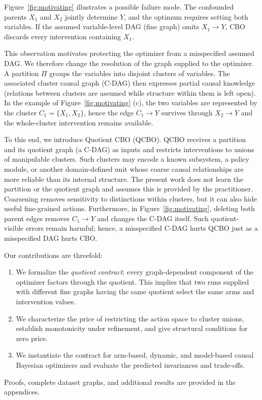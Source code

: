 \documentclass[twoside]{article}
\begin{document}
Figure~\ref{fig:motivating} illustrates a possible failure mode. The confounded parents $X_1$ and $X_2$ jointly determine $Y$, and the optimum requires setting both variables. If the assumed variable-level DAG (fine graph) omits $X_1\to Y$, CBO discards every intervention containing $X_1$. 

This observation motivates protecting the optimizer from a misspecified assumed DAG. We therefore change the resolution of the graph supplied to the optimizer. A partition $\Pi$ groups the variables into disjoint clusters of variables. The associated cluster causal graph (C-DAG) then expresses partial causal knowledge (relations between clusters are assumed while structure within them is left open). In the example of Figure~\ref{fig:motivating} (c), the two variables are represented by the cluster $C_1=\{X_1,X_2\}$, hence the edge $C_1\to Y$ survives through $X_2\to Y$ and the whole-cluster intervention remains available.

To this end, we introduce Quotient CBO (QCBO). QCBO receives a partition and its quotient graph (a C-DAG) as inputs and restricts interventions to unions of manipulable clusters. Such clusters may encode a known subsystem, a policy module, or another domain-defined unit whose coarse causal relationships are more reliable than its internal structure. The present work does not learn the partition or the quotient graph and assumes this is provided by the practitioner. Coarsening removes sensitivity to distinctions within clusters, but it can also hide useful fine-grained actions. Furthermore, in Figure~\ref{fig:motivating}, deleting both parent edges removes $C_1\to Y$ and changes the C-DAG itself. Such quotient-visible errors remain harmful; hence, a misspecified C-DAG hurts QCBO just as a misspecified DAG hurts CBO. 

Our contributions are threefold: 

\begin{enumerate}
    \item We formalize the \emph{quotient contract}: every graph-dependent component of the optimizer factors through the quotient. This implies that two runs supplied with different fine graphs having the same quotient select the same arms and intervention values.
    \item We characterize the price of restricting the action space to cluster unions, establish monotonicity under refinement, and give structural conditions for zero price. 
    \item We instantiate the contract for arm-based, dynamic, and model-based causal Bayesian optimizers and evaluate the predicted invariances and trade-offs. 
    
   
\end{enumerate} 
 Proofs, complete dataset graphs, and additional results are provided in the appendices.
\end{document}
